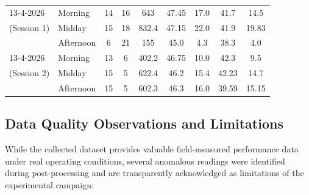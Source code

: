 \begin{table}[H]
\begin{tabular}{@{}l l c c c c c c c@{}}
\midrule
13-4-2026 & Morning & 14 & 16 & 643 & 47.45 & 17.0 & 41.7 & 14.5 \\
(Session 1) & Midday & 15 & 18 & 832.4 & 47.15 & 22.0 & 41.9 & 19.83 \\
 & Afternoon & 6 & 21 & 155 & 45.0 & 4.3 & 38.3 & 4.0 \\
\midrule
13-4-2026 & Morning & 13 & 6 & 402.2 & 46.75 & 10.0 & 42.3 & 9.5 \\
(Session 2) & Midday & 15 & 5 & 622.4 & 46.2 & 15.4 & 42.23 & 14.7 \\
 & Afternoon & 15 & 5 & 602.3 & 46.3 & 16.0 & 39.59 & 15.15 \\
\bottomrule
\end{tabular}
\end{table}


\subsection{Data Quality Observations and Limitations}

While the collected dataset provides valuable field-measured performance data under real operating conditions, several anomalous readings were identified during post-processing and are transparently acknowledged as limitations of the experimental campaign:

